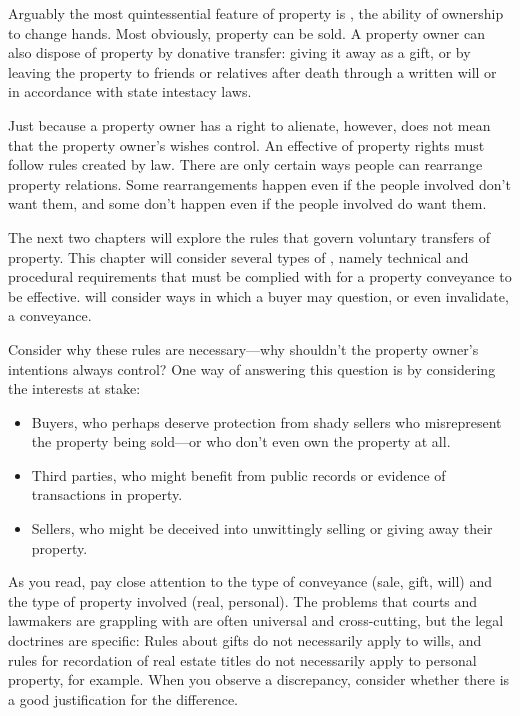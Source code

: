 Arguably the most quintessential feature of property is , the
ability of ownership to change hands. Most obviously, property can be sold. A
property owner can also dispose of property by donative transfer: giving it away
as a gift, or by leaving the property to friends or relatives after death
through a written will or in accordance with state intestacy laws.

Just because a property owner has a right to alienate, however, does not mean
that the property owner's wishes control. An effective  of
property
rights must follow rules created by law.  There are only certain ways people can
rearrange property relations.  Some rearrangements happen even if the people
involved don't want them, and some don't happen even if the people involved do
want them.

The next two chapters will explore the rules that govern voluntary transfers of
property. This chapter will consider several types of , namely
technical and procedural requirements that must be complied with for a property
conveyance to be effective.  will consider
ways in which a buyer may question, or even invalidate, a conveyance.

Consider why these rules are necessary---why shouldn't the property owner's
intentions always control? One way of answering this question is by considering
the interests at stake:
\begin{itemize}
\item Buyers, who perhaps deserve protection from shady sellers
who misrepresent the property being sold---or who don't even own the property at
all.
\item Third parties, who might benefit from public records or evidence of
transactions in property.
\item Sellers, who might be deceived into unwittingly selling or giving away
their property.
\end{itemize}

As you read, pay close attention to the type of conveyance (sale, gift, will)
and the type of property involved (real, personal). The problems that courts and
lawmakers are grappling with are often universal and cross-cutting, but the
legal doctrines are specific: Rules about gifts do not necessarily apply to
wills, and rules for recordation of real estate titles do not necessarily apply
to personal property, for example. When you observe a discrepancy, consider
whether there is a good justification for the difference.
